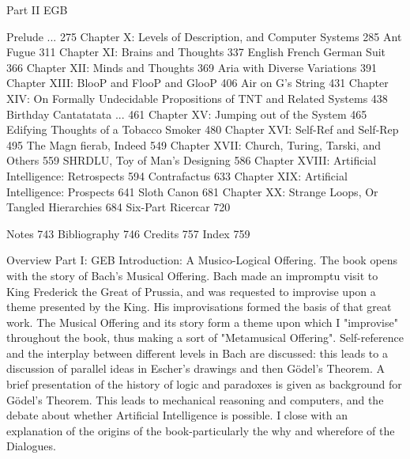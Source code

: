 Part II EGB

      Prelude ...                                          275
Chapter X: Levels of Description, and Computer Systems     285
      Ant Fugue                                            311
Chapter XI: Brains and Thoughts                            337
      English French German Suit                           366
Chapter XII: Minds and Thoughts                            369
      Aria with Diverse Variations                         391
Chapter XIII: BlooP and FlooP and GlooP                    406
      Air on G's String                                    431
Chapter XIV: On Formally Undecidable Propositions of TNT
   and Related Systems                                     438
      Birthday Cantatatata ...                             461
Chapter XV: Jumping out of the System                      465
      Edifying Thoughts of a Tobacco Smoker                480
Chapter XVI: Self-Ref and Self-Rep                         495
      The Magn fierab, Indeed                              549
Chapter XVII: Church, Turing, Tarski, and Others           559
      SHRDLU, Toy of Man's Designing                       586
Chapter XVIII: Artificial Intelligence: Retrospects        594
      Contrafactus                                         633
Chapter XIX: Artificial Intelligence: Prospects            641
      Sloth Canon                                          681
Chapter XX: Strange Loops, Or Tangled Hierarchies          684
      Six-Part Ricercar                                    720


Notes                                                      743
Bibliography                                               746
Credits                                                    757
Index                                                      759





                                             Overview
                                           Part I: GEB
Introduction: A Musico-Logical Offering. The book opens with the story of Bach's Musical
   Offering. Bach made an impromptu visit to King Frederick the Great of Prussia, and was
   requested to improvise upon a theme presented by the King. His improvisations formed the basis
   of that great work. The Musical Offering and its story form a theme upon which I "improvise"
   throughout the book, thus making a sort of "Metamusical Offering". Self-reference and the
   interplay between different levels in Bach are discussed: this leads to a discussion of parallel
   ideas in Escher's drawings and then Gödel’s Theorem. A brief presentation of the history of logic
   and paradoxes is given as background for Gödel’s Theorem. This leads to mechanical reasoning
   and computers, and the debate about whether Artificial Intelligence is possible. I close with an
   explanation of the origins of the book-particularly the why and wherefore of the Dialogues.

